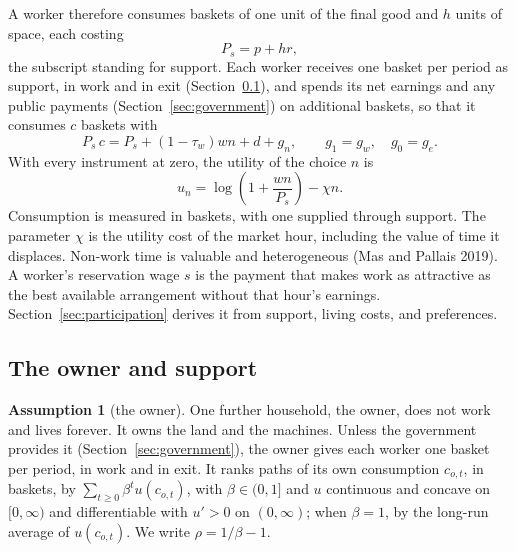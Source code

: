 \documentclass[12pt]{article}
\theoremstyle{plain}
\theoremstyle{definition}
\newtheorem{assumption}{Assumption}
\theoremstyle{remark}
\begin{document}
A worker therefore consumes baskets of one unit of the final good and $h$ units of space, each costing
\begin{equation}\label{eq:7}
P_s=p+hr,
\end{equation}
the subscript standing for support. Each worker receives one basket per period as support, in work and in exit (Section~\ref{sec:owner}), and spends its net earnings and any public payments (Section~\ref{sec:government}) on additional baskets, so that it consumes $c$ baskets with
\begin{equation}\label{eq:budget}
P_s\,c=P_s+(1-\tau_w)wn+d+g_n,\qquad g_1=g_w,\quad g_0=g_e.
\end{equation}
With every instrument at zero, the utility of the choice $n$ is
\begin{equation}\label{eq:8}
u_n=\log\left(1+\frac{wn}{P_s}\right)-\chi n.
\end{equation}
Consumption is measured in baskets, with one supplied through support. The parameter $\chi$ is the utility cost of the market hour, including the value of time it displaces. Non-work time is valuable and heterogeneous (Mas and Pallais 2019).
A worker's reservation wage $s$ is the payment that makes work as attractive as the best available arrangement without that hour's earnings. Section~\ref{sec:participation} derives it from support, living costs, and preferences.

\subsection{The owner and support}\label{sec:owner}

\begin{assumption}[the owner]\label{ass:owner}
One further household, the owner, does not work and lives forever. It owns the land and the machines. Unless the government provides it (Section~\ref{sec:government}), the owner gives each worker one basket per period, in work and in exit. It ranks paths of its own consumption $c_{o,t}$, in baskets, by $\sum_{t\ge0}\beta^tu(c_{o,t})$, with $\beta\in(0,1]$ and $u$ continuous and concave on $[0,\infty)$ and differentiable with $u'>0$ on $(0,\infty)$; when $\beta=1$, by the long-run average of $u(c_{o,t})$. We write $\rho=1/\beta-1$.
\end{assumption}
\end{document}
